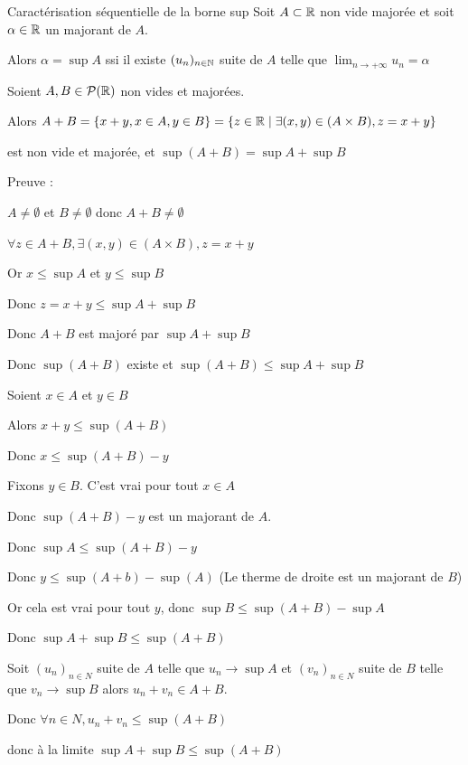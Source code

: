 \begin{theoreme}{Caractérisation séquentielle de la borne sup}{}
    Soit $A \subset \mathbb{R}$ non vide majorée et soit $\alpha \in \mathbb{R}$ un majorant de $A$. 

    Alors $\alpha = \sup A$ ssi il existe $(u_n)_{n \in \mathbb{N}}$ suite de $A$
    telle que $\lim_{n \to + \infty} u_n = \alpha$
\end{theoreme}


\begin{exemple}
    Soient $A, B \in \mathcal P(\mathbb{R})$ non vides et majorées. 

    Alors $A + B = \{x + y, x \in A, y \in B\} = \{z \in \mathbb{R} \mid \exists (x, y) \in (A \times B), z = x + y\}$

    est non vide et majorée, et $\sup( A + B) = \sup A + \sup B$

    Preuve : 

    $A \neq \emptyset$ et $B \neq \emptyset$ donc $A + B \neq \emptyset$ 

    $\forall z \in A + B, \exists(x, y) \in (A \times B), z = x + y$

    Or $x \leqslant \sup A $ et $y \leqslant \sup B$

    Donc $z = x + y \leqslant \sup A + \sup B$

    Donc $A + B$ est majoré par $\sup A + \sup B$

    Donc $\sup( A+ B)$ existe et $\sup (A + B) \leqslant \sup A + \sup B$


    \svspace Soient $x \in A$ et $y \in B$ 

    Alors $x + y \leqslant \sup(A + B)$

    Donc $x \leqslant \sup(A + B) - y$

    Fixons $y \in B$. C'est vrai pour tout $x \in A$

    Donc $\sup(A + B) - y$ est un majorant de $A$. 

    Donc $\sup A \leqslant \sup(A + B) - y$

    Donc $y \leqslant \sup(A + b) - \sup(A)$ (Le therme de droite est un majorant de $B$)

    Or cela est vrai pour tout $y$, donc $\sup B \leqslant \sup(A + B) - \sup A$

    Donc $\sup A + \sup B \leqslant \sup(A + B)$


    \svspace Soit $(u_n)_{n \in N}$ suite de $A$ telle que $u_n \longrightarrow \sup A$
    et $(v_n)_{n \in N}$ suite de $B$ telle que $ v_n \longrightarrow \sup B$
    alors $u_n + v_n \in A + B$. 

    Donc $\forall n \in N, u_n + v_n \leqslant \sup(A + B)$
    
    donc à la limite $\sup A + \sup B \leqslant \sup(A + B)$

\end{exemple}

